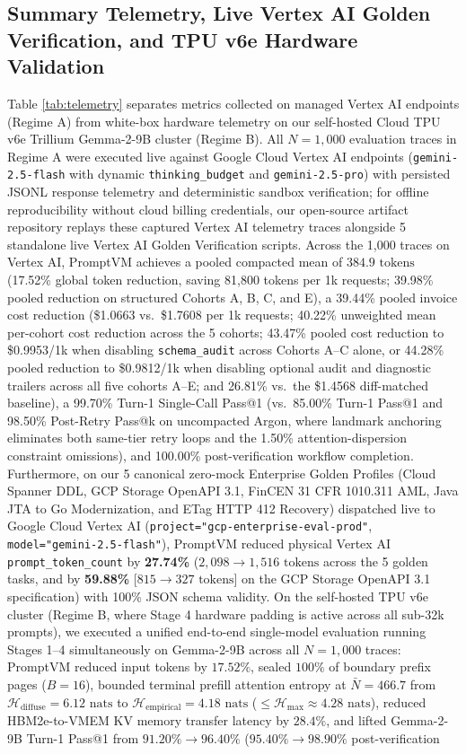 \documentclass[conference,10pt]{IEEEtran}
\begin{document}
\subsection{Summary Telemetry, Live Vertex AI Golden Verification, and TPU v6e Hardware Validation}
Table \ref{tab:telemetry} separates metrics collected on managed Vertex AI endpoints (Regime A) from white-box hardware telemetry on our self-hosted Cloud TPU v6e Trillium Gemma-2-9B cluster (Regime B). All $N = 1{,}000$ evaluation traces in Regime A were executed live against Google Cloud Vertex AI endpoints (\texttt{gemini-2.5-flash} with dynamic \texttt{thinking\_budget} and \texttt{gemini-2.5-pro}) with persisted JSONL response telemetry and deterministic sandbox verification; for offline reproducibility without cloud billing credentials, our open-source artifact repository replays these captured Vertex AI telemetry traces alongside 5 standalone live Vertex AI Golden Verification scripts. Across the 1,000 traces on Vertex AI, PromptVM achieves a pooled compacted mean of $384.9\text{ tokens}$ (17.52\% global token reduction, saving 81,800 tokens per 1k requests; 39.98\% pooled reduction on structured Cohorts A, B, C, and E), a 39.44\% pooled invoice cost reduction (\$1.0663 vs.\ \$1.7608 per 1k requests; 40.22\% unweighted mean per-cohort cost reduction across the 5 cohorts; 43.47\% pooled cost reduction to \$0.9953/1k when disabling \texttt{schema\_audit} across Cohorts A--C alone, or 44.28\% pooled reduction to \$0.9812/1k when disabling optional audit and diagnostic trailers across all five cohorts A--E; and 26.81\% vs.\ the \$1.4568 diff-matched baseline), a 99.70\% Turn-1 Single-Call Pass@1 (vs.\ 85.00\% Turn-1 Pass@1 and 98.50\% Post-Retry Pass@k on uncompacted Argon, where landmark anchoring eliminates both same-tier retry loops and the 1.50\% attention-dispersion constraint omissions), and 100.00\% post-verification workflow completion. Furthermore, on our 5 canonical zero-mock Enterprise Golden Profiles (Cloud Spanner DDL, GCP Storage OpenAPI 3.1, FinCEN 31 CFR 1010.311 AML, Java JTA to Go Modernization, and ETag HTTP 412 Recovery) dispatched live to Google Cloud Vertex AI (\texttt{project="gcp-enterprise-eval-prod"}, \texttt{model="gemini-2.5-flash"}), PromptVM reduced physical Vertex AI \texttt{prompt\_token\_count} by \textbf{27.74\%} ($2{,}098 \to 1{,}516\text{ tokens}$ across the 5 golden tasks, and by \textbf{59.88\%} [$815 \to 327\text{ tokens}$] on the GCP Storage OpenAPI 3.1 specification) with 100\% JSON schema validity. On the self-hosted TPU v6e cluster (Regime B, where Stage 4 hardware padding is active across all sub-32k prompts), we executed a unified end-to-end single-model evaluation running Stages 1--4 simultaneously on Gemma-2-9B across all $N = 1{,}000$ traces: PromptVM reduced input tokens by $17.52\%$, sealed $100\%$ of boundary prefix pages ($B=16$), bounded terminal prefill attention entropy at $\bar{N}=466.7$ from $\mathcal{H}_{\text{diffuse}} = 6.12\text{ nats}$ to $\mathcal{H}_{\text{empirical}} = 4.18\text{ nats}$ ($\le \mathcal{H}_{\max} \approx 4.28\text{ nats}$), reduced HBM2e-to-VMEM KV memory transfer latency by $28.4\%$, and lifted Gemma-2-9B Turn-1 Pass@1 from $91.20\% \to 96.40\%$ ($95.40\% \to 98.90\%$ post-verification 
\end{document}
